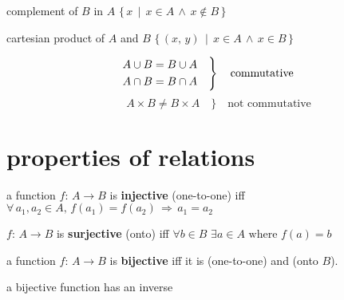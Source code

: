 \documentclass{article}
\newcommand{\spaced}[1]{\, #1 \,}
\newcommand{\scomp}{\spaced{\backslash}}
\newcommand{\sland}{\spaced{\land}}
\newcommand{\simplies}{\spaced{\Rightarrow}}
\newcommand{\slexists}{\, \exists}
\newcommand{\buildset}[2]{\{\spaced{#1} \mid \spaced{#2} \}}
\begin{document}
        \begin{notation}[$A \scomp B$]
            complement of $B$ in $A$ \tab\tab\tab $\buildset{x}{x \in A \sland x \not\in B}$
        \end{notation}
        
        \begin{notation}[$A \times B$]
            cartesian product of $A$ and $B$ \tab $\buildset{(x,\, y)}{x \in A \sland x \in B}$
        \end{notation}
        
        \vspace{1em}
        \begin{note}
            \hspace{1em}\vspace{1em}
                $$\begin{rcases*}
                    A \cup B = B \cup A \quad \\
                    A \cap B = B \cap A \quad \\
                \end{rcases*} \quad \text{commutative}$$
                $$\quad\quad A \times B \not= B \times A \quad \big\rbrace \quad \text {not commutative}$$
        \end{note}
        \vspace{1em}

    \newpage
    \section{properties of relations}
        
        \color{Red}
        \begin{definition}[injective]\label{injective}
            a function $f: \, A \rightarrow B$ is 
            \textbf{injective} (one-to-one) iff $\forall \, a_1, a_2 \in A, \, f(a_1) = f(a_2) \simplies a_1 = a_2$
        \end{definition}
        
        \begin{definition}[surjective]\label{surjective}
            $f: \, A \rightarrow B$ is 
            \textbf{surjective} (onto) iff $\forall b \in B \, \slexists a \in A \text{ where } f(a) = b$
        \end{definition}
        
        \begin{definition}[bijective]\label{bijective}
            a function $f: \, A \rightarrow B$ is \textbf{bijective} iff it is 
             (one-to-one) and  (onto $B$).
            \color{Black}
            
            \begin{note}
                \tab a bijective function has an inverse
            \end{note}
        \end{definition}
        
\end{document}
